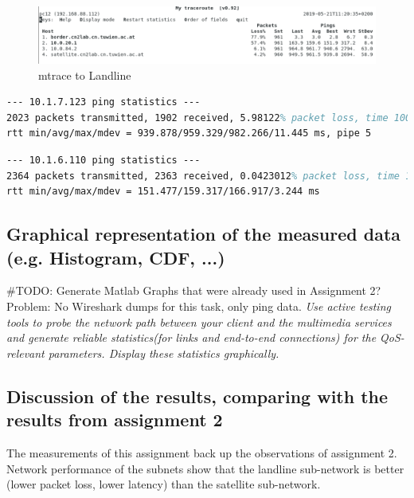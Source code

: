 \documentclass[parskip=full]{scrartcl}
\begin{document}
\begin{figure}[ht]
    \centering
   \includegraphics[width=\textwidth]{images/mytraceroute2.png} 
    \caption{mtrace to Landline}
    \label{fig:mtraceLandline}
\end{figure}


\begin{lstlisting}[language=tex, breaklines, frame=single, caption={Landline Network Parameters}, label=lst:landlineNetwork, float, floatplacement=h]
--- 10.1.7.123 ping statistics ---
2023 packets transmitted, 1902 received, 5.98122% packet loss, time 1004ms
rtt min/avg/max/mdev = 939.878/959.329/982.266/11.445 ms, pipe 5
\end{lstlisting}

\begin{lstlisting}[language=tex, breaklines, frame=single, caption={Landline Network Parameters}, label=lst:landlineNetwork, float, floatplacement=h]
--- 10.1.6.110 ping statistics ---
2364 packets transmitted, 2363 received, 0.0423012% packet loss, time 1105ms
rtt min/avg/max/mdev = 151.477/159.317/166.917/3.244 ms
\end{lstlisting}


\subsection{Graphical representation of the measured data (e.g. Histogram, CDF, ...)}

\#TODO: Generate Matlab Graphs that were already used in Assignment 2?
Problem: No Wireshark dumps for this task, only ping data. 
\textit{Use active testing tools to probe the network path between your client and the multimedia services and generate reliable statistics(for links and end-to-end connections) for the QoS-relevant parameters. Display these statistics graphically.}
\subsection{Discussion of the results, comparing with the results from assignment 2}
The measurements of this assignment back up the observations of assignment 2. 
Network performance of the subnets show that the landline sub-network is better (lower packet loss, lower latency) than the satellite sub-network. 
\end{document}
